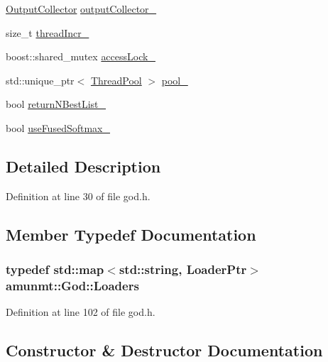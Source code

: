 \begin{DoxyCompactItemize}
\item 
\hyperlink{classamunmt_1_1OutputCollector}{Output\+Collector} \hyperlink{classamunmt_1_1God_a2dc4151a17c691e86bab1f2cc1d0a932}{output\+Collector\+\_\+}
\item 
size\+\_\+t \hyperlink{classamunmt_1_1God_a900c7443532f035640b4ff064899b50e}{thread\+Incr\+\_\+}
\item 
boost\+::shared\+\_\+mutex \hyperlink{classamunmt_1_1God_afcd5629990403f8b2b16d9bd08db238e}{access\+Lock\+\_\+}
\item 
std\+::unique\+\_\+ptr$<$ \hyperlink{classamunmt_1_1ThreadPool}{Thread\+Pool} $>$ \hyperlink{classamunmt_1_1God_a93baaad747946f9e25f35383f65c3981}{pool\+\_\+}
\item 
bool \hyperlink{classamunmt_1_1God_a83284d424437eb00ebe5fcd5666cebfb}{return\+N\+Best\+List\+\_\+}
\item 
bool \hyperlink{classamunmt_1_1God_a2ea1b8cdaf00c9a882945ba8238f99ea}{use\+Fused\+Softmax\+\_\+}
\end{DoxyCompactItemize}


\subsection{Detailed Description}


Definition at line 30 of file god.\+h.



\subsection{Member Typedef Documentation}
\subsubsection[{\texorpdfstring{Loaders}{Loaders}}]{\setlength{\rightskip}{0pt plus 5cm}typedef std\+::map$<$std\+::string, {\bf Loader\+Ptr}$>$ {\bf amunmt\+::\+God\+::\+Loaders}\hspace{0.3cm}{\ttfamily [private]}}\hypertarget{classamunmt_1_1God_abe005048d71d1ac78750395d4ac8a531}{}\label{classamunmt_1_1God_abe005048d71d1ac78750395d4ac8a531}


Definition at line 102 of file god.\+h.



\subsection{Constructor \& Destructor Documentation}

